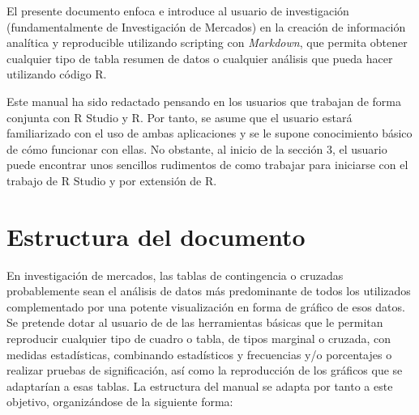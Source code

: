 \documentclass[
]{book}
\begin{document}
El presente documento enfoca e introduce al usuario de investigación (fundamentalmente de Investigación de Mercados) en la creación de información analítica y reproducible utilizando scripting con \emph{Markdown}, que permita obtener cualquier tipo de tabla resumen de datos o cualquier análisis que pueda hacer utilizando código R.

Este manual ha sido redactado pensando en los usuarios que trabajan de forma conjunta con R Studio y R. Por tanto, se asume que el usuario estará familiarizado con el uso de ambas aplicaciones y se le supone conocimiento básico de cómo funcionar con ellas. No obstante, al inicio de la sección 3, el usuario puede encontrar unos sencillos rudimentos de como trabajar para iniciarse con el trabajo de R Studio y por extensión de R.

\hypertarget{estructura-del-documento}{%
\section{Estructura del documento}\label{estructura-del-documento}}

En investigación de mercados, las tablas de contingencia o cruzadas probablemente sean el análisis de datos más predominante de todos los utilizados complementado por una potente visualización en forma de gráfico de esos datos. Se pretende dotar al usuario de de las herramientas básicas que le permitan reproducir cualquier tipo de cuadro o tabla, de tipos marginal o cruzada, con medidas estadísticas, combinando estadísticos y frecuencias y/o porcentajes o realizar pruebas de significación, así como la reproducción de los gráficos que se adaptarían a esas tablas. La estructura del manual se adapta por tanto a este objetivo, organizándose de la siguiente forma:
\end{document}
